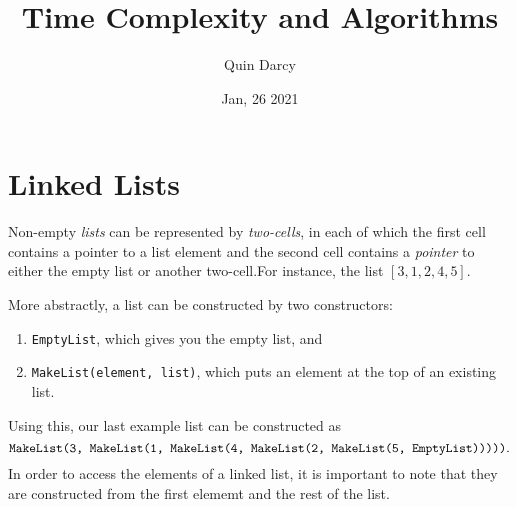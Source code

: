 \documentclass[12pt]{article}
\theoremstyle{definition}
\theoremstyle{definition}
\begin{document}
\title{Time Complexity and Algorithms}
\author{Quin Darcy}
\date{Jan, 26 2021}
\maketitle
    \section{Linked Lists}
    Non-empty \textit{lists} can be represented by \textit{two-cells}, in each
    of which the first cell contains a pointer to a list element and the second
    cell contains a \textit{pointer} to either the empty list or another
    two-cell.For instance, the list $[3, 1, 2, 4, 5]$.\par\hspace{4mm} More abstractly, a list can be constructed by two
    constructors:
        \begin{enumerate}
            \item \texttt{EmptyList}, which gives you the empty list, and 
            \item \texttt{MakeList(element, list)}, which puts an element at the
                top of an existing list.
        \end{enumerate}
    Using this, our last example list can be constructed as 
        \begin{equation*}
            \text{\texttt{MakeList(3, MakeList(1, MakeList(4, MakeList(2,
            MakeList(5, EmptyList)))))}}.
        \end{equation*}
    In order to access the elements of a linked list, it is important to note
    that they are constructed from the first elememt and the rest of the list. 
    \
\end{document}
